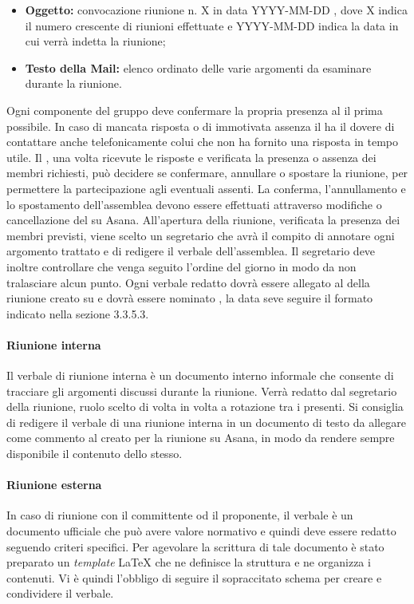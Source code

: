 \documentclass[12pt,a4paper]{article}
\begin{document}
\begin{itemize}
  \item \textbf{Oggetto:} convocazione riunione n. X in data YYYY-MM-DD , dove X indica il numero crescente di riunioni effettuate e YYYY-MM-DD indica la data in cui verrà indetta la riunione;
  \item \textbf{Testo della Mail:} elenco ordinato delle varie argomenti da esaminare durante la riunione.
\end{itemize}
Ogni componente del gruppo deve confermare la propria presenza al \PM{} il prima possibile. 
In caso di mancata risposta o di immotivata assenza il \PM{} ha il dovere di contattare anche telefonicamente colui che non ha fornito una risposta in tempo utile. Il \PM{}, una volta ricevute le risposte e verificata la presenza o assenza dei membri richiesti, può decidere se confermare, annullare o spostare la riunione, per permettere la partecipazione agli eventuali assenti. La conferma, l'annullamento e lo spostamento dell'assemblea devono essere effettuati attraverso modifiche o cancellazione del  su Asana.
All'apertura della riunione, verificata la presenza dei membri previsti, viene scelto un segretario che avrà il compito di annotare ogni argomento trattato e di redigere il verbale dell'assemblea.
Il segretario deve inoltre controllare che venga seguito l'ordine del giorno in modo da non tralasciare alcun punto.
Ogni verbale redatto dovrà essere allegato al  della riunione creato su \textit{} e dovrà essere nominato , la data seve seguire il formato indicato nella sezione 3.3.5.3.

\paragraph{Riunione interna}
Il verbale di riunione interna è un documento interno informale che consente di tracciare gli argomenti discussi durante la riunione. Verrà redatto dal segretario della riunione, ruolo scelto di volta in volta a rotazione tra i presenti. Si consiglia di redigere il verbale di una riunione interna in un documento di testo da allegare come commento al  creato per la riunione su Asana, in modo da rendere sempre disponibile il contenuto dello stesso.

\paragraph{Riunione esterna}
In caso di riunione con il committente od il proponente, il verbale è un documento ufficiale che può avere valore normativo e quindi deve essere redatto seguendo criteri specifici.
Per agevolare la scrittura di tale documento è stato preparato un \emph{template} \LaTeX{} che ne definisce la struttura e ne organizza i contenuti. Vi è quindi l'obbligo di seguire il sopraccitato schema per creare e condividere il verbale.
\end{document}

